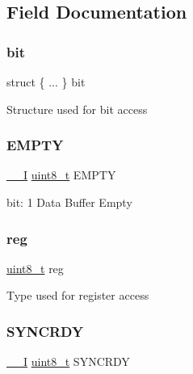 \subsection{Field Documentation}
\mbox{\label{union_d_a_c___i_n_t_f_l_a_g___type_a22176a9eba77ce65828ed30282d308cf}} 
\subsubsection{\texorpdfstring{bit}{bit}}
{\footnotesize\ttfamily struct \{ ... \}   bit}

Structure used for bit access \mbox{\label{union_d_a_c___i_n_t_f_l_a_g___type_a9b286a819bbfab7c4fd92bff3620ac92}} 
\subsubsection{\texorpdfstring{EMPTY}{EMPTY}}
{\footnotesize\ttfamily \mbox{\hyperlink{core__cm0plus_8h_af63697ed9952cc71e1225efe205f6cd3}{\+\_\+\+\_\+I}} \mbox{\hyperlink{union_d_a_c___i_n_t_f_l_a_g___type_a5b4208c6f4c4a4290c4f2804d1eb1d5b}{uint8\+\_\+t}} E\+M\+P\+TY}

bit\+: 1 Data Buffer Empty \mbox{\label{union_d_a_c___i_n_t_f_l_a_g___type_a9428adc9af4653a2050e2536b55dec8d}} 
\subsubsection{\texorpdfstring{reg}{reg}}
{\footnotesize\ttfamily \mbox{\hyperlink{union_d_a_c___i_n_t_f_l_a_g___type_a5b4208c6f4c4a4290c4f2804d1eb1d5b}{uint8\+\_\+t}} reg}

Type used for register access \mbox{\label{union_d_a_c___i_n_t_f_l_a_g___type_ae8a10cfa0bb63130ae1e8150943d680b}} 
\subsubsection{\texorpdfstring{SYNCRDY}{SYNCRDY}}
{\footnotesize\ttfamily \mbox{\hyperlink{core__cm0plus_8h_af63697ed9952cc71e1225efe205f6cd3}{\+\_\+\+\_\+I}} \mbox{\hyperlink{union_d_a_c___i_n_t_f_l_a_g___type_a5b4208c6f4c4a4290c4f2804d1eb1d5b}{uint8\+\_\+t}} S\+Y\+N\+C\+R\+DY}


